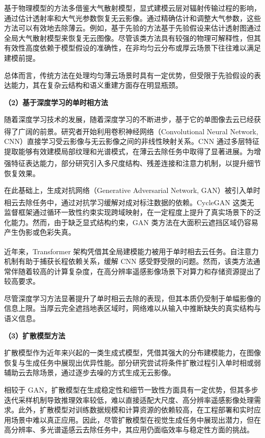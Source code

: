 基于物理模型的方法多借鉴大气散射模型，显式建模云层对辐射传输过程的影响，通过估计透射率和大气光参数恢复无云影像。通过精确估计和调整大气参数，这些方法可以有效地去除薄云。例如，基于先验的方法基于先验假设来估计透射图通过全局大气散射模型来恢复无云图像。尽管该类方法具有较强的物理可解释性，但其有效性高度依赖于模型假设的准确性，在非均匀云分布或厚云场景下往往难以满足建模前提。

总体而言，传统方法在处理均匀薄云场景时具有一定优势，但受限于先验假设的表达能力，其在复杂云结构和语义重建方面存在明显瓶颈。

\textbf{（2）基于深度学习的单时相方法}

随着深度学习技术的发展，随着深度学习的不断进步，基于它的单图像去云已经获得了广阔的前景\textsuperscript{\cite{tao2022thick}}。研究者开始利用卷积神经网络（Convolutional Neural Network, CNN）直接学习受云影像与无云影像之间的非线性映射关系。CNN 通过多层特征提取能够有效建模局部纹理和光谱模式，在薄云去除任务中取得了显著进展。为增强特征表达能力，部分研究引入多尺度结构\textsuperscript{\cite{shao2019cloud}}、残差连接\textsuperscript{\cite{zhang2017beyond}}和注意力机制\textsuperscript{\cite{wen2022effective}}，以提升细节恢复效果。

在此基础上，生成对抗网络（Generative Adversarial Network, GAN）被引入单时相云去除任务中，通过对抗学习缓解对成对标注数据的依赖\textsuperscript{\cite{ma2023cloud,zhao2021cloud,wen2021generative}}。CycleGAN \textsuperscript{\cite{singh2018cloud}}这类无监督框架通过循环一致性约束实现跨域映射，在一定程度上提升了真实场景下的泛化能力。然而，由于缺乏显式结构约束，GAN 类方法在大面积云遮挡区域仍容易产生伪影或色彩失真。

近年来，Transformer 架构凭借其全局建模能力被用于单时相去云任务\textsuperscript{\cite{zhang2026hcv}}。自注意力机制有助于捕获长程依赖关系，缓解 CNN 感受野受限的问题。然而，该类方法通常伴随着较高的计算复杂度，在高分辨率遥感影像场景下对算力和存储资源提出了较高要求。

尽管深度学习方法显著提升了单时相云去除的表现，但其本质仍受制于单幅影像的信息上限。当厚云完全遮挡地表区域时，网络难以从输入中推断缺失的真实结构与语义信息。

\textbf{（3）扩散模型方法}

扩散模型作为近年来兴起的一类生成式模型，凭借其强大的分布建模能力，在图像恢复与生成任务中展现出优异性能。部分研究尝试将条件扩散过程引入单时相或弱辅助云去除场景，通过逐步去噪的方式生成无云影像。

相较于 GAN，扩散模型在生成稳定性和细节一致性方面具有一定优势，但其多步迭代采样机制导致推理效率较低，难以直接适配大尺度、高分辨率遥感影像处理需求。此外，扩散模型对训练数据规模和计算资源的依赖较高，在工程部署和实时应用场景中难以真正应用。因此，尽管扩散模型在视觉生成任务中展现出潜力，但在高分辨率、多光谱遥感云去除任务中，其应用仍面临效率与稳定性方面的挑战。

